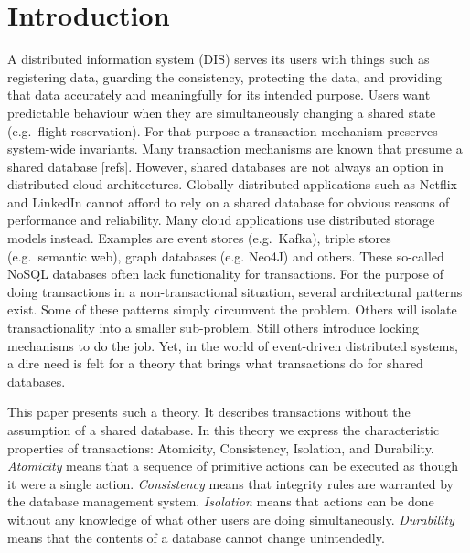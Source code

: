 \documentclass{elsarticle}
\begin{document}
\section{Introduction}
\label{sct:Introduction}
	A distributed information system (DIS) serves its users with things such as
	registering data, guarding the consistency, protecting the data,
	and providing that data accurately and meaningfully for its intended purpose.
	Users want predictable behaviour when they are simultaneously changing a shared state (e.g.\ flight reservation).
	For that purpose a transaction mechanism preserves system-wide invariants.
	Many transaction mechanisms are known that presume a shared database [refs].
	However, shared databases are not always an option in distributed cloud architectures.
	Globally distributed applications such as Netflix and LinkedIn cannot afford to rely on a shared database for obvious reasons of performance and reliability.
	Many cloud applications use distributed storage models instead.
	Examples are event stores (e.g.\ Kafka), triple stores (e.g.\ semantic web), graph databases (e.g. Neo4J) and others.
	These so-called NoSQL databases often lack functionality for transactions.
	For the purpose of doing transactions in a non-transactional situation, several architectural patterns exist.
	Some of these patterns simply circumvent the problem.
	Others will isolate transactionality into a smaller sub-problem.
	Still others introduce locking mechanisms to do the job.
	Yet, in the world of event-driven distributed systems, a dire need is felt for a theory that brings what transactions do for shared databases.
	
	This paper presents such a theory.
	It describes transactions without the assumption of a shared database.
	In this theory we express the characteristic properties of transactions: Atomicity, Consistency, Isolation, and Durability.
	{\em Atomicity} means that a sequence of primitive actions can be executed as though it were a single action.
	{\em Consistency} means that integrity rules are warranted by the database management system.
	{\em Isolation} means that actions can be done without any knowledge of what other users are doing simultaneously.
	{\em Durability} means that the contents of a database cannot change unintendedly.
\end{document}
